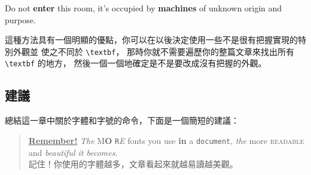 \begin{example}
\newcommand{\oops}[1]{%
 \textbf{#1}}
Do not \oops{enter} this room,
it's occupied by \oops{machines}
of unknown origin and purpose.
\end{example}

這種方法具有一個明顯的優點，你可以在以後決定使用一些不是很有把握實現的特別外觀並
使之不同於 \verb|\textbf|，
那時你就不需要遍歷你的整篇文章來找出所有 \verb|\textbf| 的地方，
然後一個一個地確定是不是要改成沒有把握的外觀。

\subsection{建議}

總結這一章中關於字體和字號的命令，下面是一個簡短的建議：\nopagebreak
\begin{quote}
 \underline{\textbf{Remember\Huge!}} \textit{The}
 \textsf{M\textbf{\LARGE O} \texttt{R}\textsl{E}} fonts \Huge you
 \tiny use \footnotesize \textbf{in} a \small \texttt{document},
 \large \textit{the} \normalsize more \textsc{readable} and
 \textsl{\textsf{beautiful} it bec\large o\Large m\LARGE e\huge s}.\\
 記住！你使用的字體越多，文章看起來就越易讀越美觀。
\end{quote}

